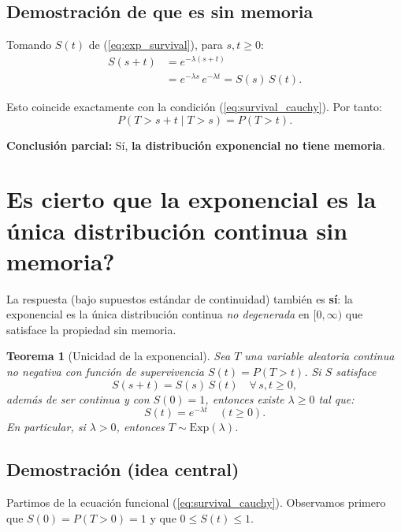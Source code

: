 \documentclass{article}
\theoremstyle{plain}
\newtheorem{theorem}{Teorema}
\theoremstyle{definition}
\begin{document}
\subsection*{Demostración de que es sin memoria}

Tomando $S(t)$ de (\ref{eq:exp_survival}), para $s,t \ge 0$:
\begin{align*}
S(s+t)
&= e^{-\lambda(s+t)} \\
&= e^{-\lambda s}\, e^{-\lambda t}
= S(s)\,S(t).
\end{align*}

Esto coincide exactamente con la condición (\ref{eq:survival_cauchy}). Por tanto:
\begin{equation*}
P(T > s+t \mid T > s) = P(T > t).
\end{equation*}

\begin{flushright}
\qedsymbol
\end{flushright}

\textbf{Conclusión parcial:} Sí, \textbf{la distribución exponencial no tiene memoria}.

\section*{\textquestiondown Es cierto que la exponencial es la única distribución continua sin memoria?}

La respuesta (bajo supuestos estándar de continuidad) también es \textbf{sí}: la exponencial es la única distribución continua \emph{no degenerada} en $[0,\infty)$ que satisface la propiedad sin memoria.

\begin{theorem}[Unicidad de la exponencial]
Sea $T$ una variable aleatoria continua no negativa con función de supervivencia $S(t) = P(T>t)$. Si $S$ satisface
$$ S(s+t) = S(s)\,S(t) \quad \forall\, s,t \ge 0, $$
además de ser continua y con $S(0)=1$, entonces existe $\lambda \ge 0$ tal que:
$$ S(t) = e^{-\lambda t} \quad (t\ge 0). $$
En particular, si $\lambda>0$, entonces $T \sim \mathrm{Exp}(\lambda)$.
\end{theorem}

\subsection*{Demostración (idea central)}

Partimos de la ecuación funcional (\ref{eq:survival_cauchy}). Observamos primero que $S(0)=P(T>0)=1$ y que $0 \le S(t) \le 1$.
\end{document}
